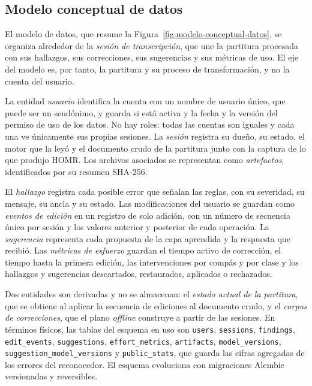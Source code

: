 \documentclass[conference]{IEEEtran}
\begin{document}
\subsection{Modelo conceptual de datos}

El modelo de datos, que resume la
Figura~\ref{fig:modelo-conceptual-datos}, se organiza alrededor de la
\textit{sesión de transcripción}, que une la partitura procesada con sus hallazgos, sus
correcciones, sus sugerencias y sus métricas de uso. El eje del modelo es,
por tanto, la partitura y su proceso de transformación, y no la cuenta del
usuario.

La entidad \textit{usuario} identifica la cuenta con un nombre de usuario
único, que puede ser un seudónimo, y guarda si está activa y la fecha y la
versión del permiso de uso de los datos. No hay roles: todas las cuentas
son iguales y cada una ve únicamente sus propias sesiones.
La \textit{sesión} registra su dueño, su estado, el motor que la leyó y el
documento crudo de la partitura junto con la captura de lo que produjo
HOMR. Los archivos asociados se representan como \textit{artefactos},
identificados por su resumen SHA-256.

El \textit{hallazgo} registra cada posible error que señalan las reglas,
con su severidad, su mensaje, su ancla y su estado. Las modificaciones del
usuario se guardan como \textit{eventos de edición} en un registro de solo
adición, con un número de secuencia único por sesión y los valores anterior
y posterior de cada operación. La \textit{sugerencia} representa cada
propuesta de la capa aprendida y la respuesta que recibió. Las
\textit{métricas de esfuerzo} guardan el tiempo activo de corrección, el
tiempo hasta la primera edición, las intervenciones por compás y por clase
y los hallazgos y sugerencias descartados, restaurados, aplicados o
rechazados.

Dos entidades son derivadas y no se almacenan: el \textit{estado actual de
la partitura}, que se obtiene al aplicar la secuencia de ediciones al
documento crudo, y el \textit{corpus de correcciones}, que el plano
\textit{offline} construye a partir de las sesiones. En términos físicos,
las tablas del esquema en uso son \texttt{users}, \texttt{sessions},
\texttt{findings}, \texttt{edit\_events}, \texttt{suggestions},
\texttt{effort\_metrics}, \texttt{artifacts}, \texttt{model\_versions},
\texttt{suggestion\_model\_versions} y \texttt{public\_stats}, que guarda
las cifras agregadas de los errores del reconocedor. El esquema evoluciona
con migraciones Alembic versionadas y reversibles.
\end{document}
